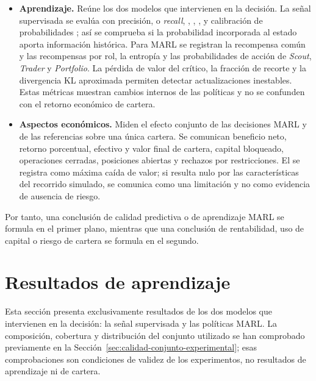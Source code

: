 \begin{itemize}
  \item \textbf{Aprendizaje.} Reúne los dos modelos que intervienen en la decisión. La señal supervisada se evalúa con precisión, \textbf{} o \emph{recall}, , , , \textbf{\emph{}} y calibración de probabilidades \cite{powers2011evaluation,saito2015pr,niculescu2005predicting,guo2017calibration}; así se comprueba si la probabilidad incorporada al estado aporta información histórica. Para MARL se registran la recompensa común y las recompensas por rol, la entropía y las probabilidades de acción de \textit{Scout}, \textit{Trader} y \textit{Portfolio}. La pérdida de valor del crítico, la fracción de recorte y la divergencia KL aproximada permiten detectar actualizaciones inestables. Estas métricas muestran cambios internos de las políticas y no se confunden con el retorno económico de cartera.

  \item \textbf{Aspectos económicos.} Miden el efecto conjunto de las decisiones MARL y de las referencias sobre una única cartera. Se comunican beneficio neto, retorno porcentual, efectivo y valor final de cartera, capital bloqueado, operaciones cerradas, posiciones abiertas y rechazos por restricciones. El \textbf{\emph{}} se registra como máxima caída de valor; si resulta nulo por las características del recorrido simulado, se comunica como una limitación y no como evidencia de ausencia de riesgo.
\end{itemize}

Por tanto, una conclusión de calidad predictiva o de aprendizaje MARL se formula en el primer plano, mientras que una conclusión de rentabilidad, uso de capital o riesgo de cartera se formula en el segundo.

\section{Resultados de aprendizaje}

Esta sección presenta exclusivamente resultados de los dos modelos que intervienen en la decisión: la señal supervisada y las políticas MARL. La composición, cobertura y distribución del conjunto utilizado se han comprobado previamente en la Sección~\ref{sec:calidad-conjunto-experimental}; esas comprobaciones son condiciones de validez de los experimentos, no resultados de aprendizaje ni de cartera.

